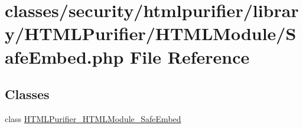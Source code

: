 \hypertarget{HTMLModule_2SafeEmbed_8php}{\section{classes/security/htmlpurifier/library/\+H\+T\+M\+L\+Purifier/\+H\+T\+M\+L\+Module/\+Safe\+Embed.php File Reference}
\label{HTMLModule_2SafeEmbed_8php}
}
\subsection*{Classes}
\begin{DoxyCompactItemize}
\item 
class \hyperlink{classHTMLPurifier__HTMLModule__SafeEmbed}{H\+T\+M\+L\+Purifier\+\_\+\+H\+T\+M\+L\+Module\+\_\+\+Safe\+Embed}
\end{DoxyCompactItemize}
